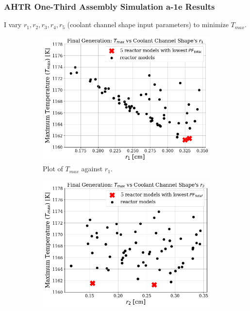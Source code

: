 \begin{frame}
    \frametitle{AHTR One-Third Assembly Simulation a-1e Results}
    I vary $r_1, r_2, r_3, r_4, r_5$ (coolant channel shape input parameters)
    to minimize $T_{max}$. 
    \begin{figure}
        \centering
        \begin{subfigure}{0.3\textwidth}
            \includegraphics[width=\linewidth]{../docs/figures/a-1e-r1.png}
            \caption{Plot of $T_{max}$ against $r_1$.}
            \label{fig:a-1e-r1} 
        \end{subfigure}
        \begin{subfigure}{0.3\textwidth}
            \includegraphics[width=\linewidth]{../docs/figures/a-1e-r2.png}

\end{subfigure}
\end{figure}
\end{frame}
